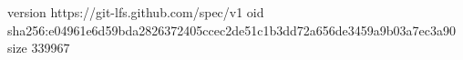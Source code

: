 version https://git-lfs.github.com/spec/v1
oid sha256:e04961e6d59bda2826372405ccec2de51c1b3dd72a656de3459a9b03a7ec3a90
size 339967
